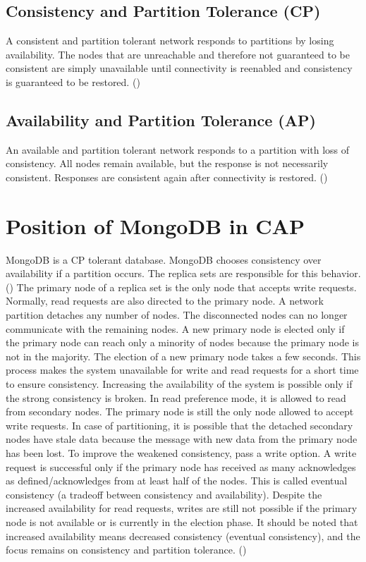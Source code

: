 \subsection*{Consistency and Partition Tolerance (CP)}
A consistent and partition tolerant network responds to partitions by losing availability. The nodes that are unreachable and therefore not guaranteed to be consistent are simply unavailable until connectivity is reenabled and consistency is guaranteed to be restored. (\cite[p.~6]{brewer:2002})
\subsection*{Availability and Partition Tolerance (AP)}
An available and partition tolerant network responds to a partition with loss of consistency. All nodes remain available, but the response is not necessarily consistent. Responses are consistent again after connectivity is restored. (\cite[p.~6]{brewer:2002})
\pagebreak
\section*{Position of MongoDB in CAP}
MongoDB is a \ac{CP} tolerant database. MongoDB chooses consistency over availability if a partition occurs. The replica sets are responsible for this behavior. (\cite{stackoverflow:2023})
The primary node of a replica set is the only node that accepts write requests. Normally, read requests are also directed to the primary node. A network partition detaches any number of nodes. The disconnected nodes can no longer communicate with the remaining nodes. A new primary node is elected only if the primary node can reach only a minority of nodes because the primary node is not in the majority. The election of a new primary node takes a few seconds. This process makes the system unavailable for write and read requests for a short time to ensure consistency.\newline
Increasing the availability of the system is possible only if the strong consistency is broken. In read preference mode, it is allowed to read from secondary nodes. The primary node is still the only node allowed to accept write requests. In case of partitioning, it is possible that the detached secondary nodes have stale data because the message with new data from the primary node has been lost.\newline
To improve the weakened consistency, pass a write option. A write request is successful only if the primary node has received as many acknowledges as defined/acknowledges from at least half of the nodes. This is called eventual consistency (a tradeoff between consistency and availability). Despite the increased availability for read requests, writes are still not possible if the primary node is not available or is currently in the election phase. It should be noted that increased availability means decreased consistency (eventual consistency), and the focus remains on consistency and partition tolerance. 
(\cite{katwal:2020})